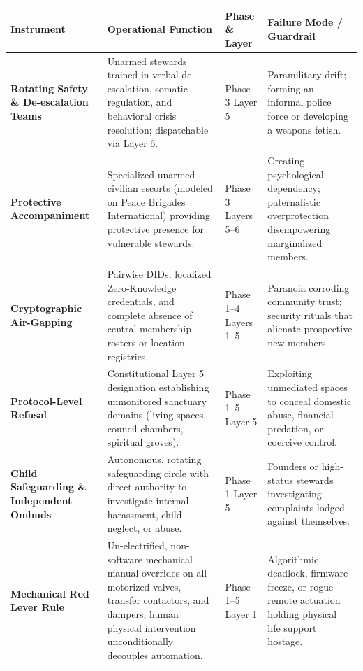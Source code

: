 \begin{table}[htbp]
\centering
\footnotesize
\setlength{\tabcolsep}{4pt}
\begin{tabular}{|p{}|p{}|p{}|p{}|}
\hline
\textbf{Instrument} & \textbf{Operational Function} & \textbf{Phase \& Layer} & \textbf{Failure Mode / Guardrail} \\
\hline
\textbf{Rotating Safety \& De-escalation Teams} & Unarmed stewards trained in verbal de-escalation, somatic regulation, and behavioral crisis resolution; dispatchable via Layer 6. & Phase 3 \newline Layer 5 & Paramilitary drift; forming an informal police force or developing a weapons fetish. \\
\hline
\textbf{Protective Accompaniment} & Specialized unarmed civilian escorts (modeled on Peace Brigades International) providing protective presence for vulnerable stewards. & Phase 3 \newline Layers 5--6 & Creating psychological dependency; paternalistic overprotection disempowering marginalized members. \\
\hline
\textbf{Cryptographic Air-Gapping} & Pairwise DIDs, localized Zero-Knowledge credentials, and complete absence of central membership rosters or location registries. & Phase 1--4 \newline Layers 1--5 & Paranoia corroding community trust; security rituals that alienate prospective new members. \\
\hline
\textbf{Protocol-Level Refusal} & Constitutional Layer 5 designation establishing unmonitored sanctuary domains (living spaces, council chambers, spiritual groves). & Phase 1--5 \newline Layer 5 & Exploiting unmediated spaces to conceal domestic abuse, financial predation, or coercive control. \\
\hline
\textbf{Child Safeguarding \& Independent Ombuds} & Autonomous, rotating safeguarding circle with direct authority to investigate internal harassment, child neglect, or abuse. & Phase 1 \newline Layer 5 & Founders or high-status stewards investigating complaints lodged against themselves. \\
\hline
\textbf{Mechanical Red Lever Rule} & Un-electrified, non-software mechanical manual overrides on all motorized valves, transfer contactors, and dampers; human physical intervention unconditionally decouples automation. & Phase 1--5 \newline Layer 1 & Algorithmic deadlock, firmware freeze, or rogue remote actuation holding physical life support hostage. \\

\end{tabular}
\end{table}
